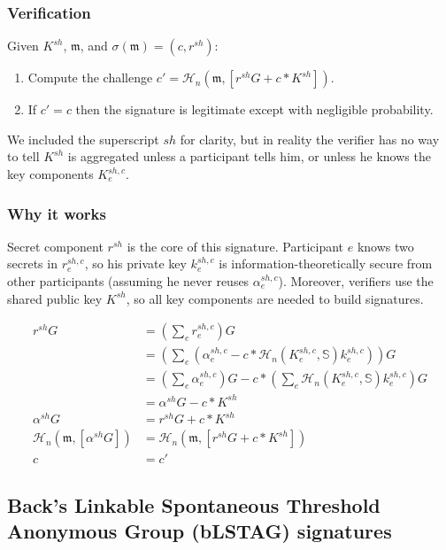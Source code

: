 \subsubsection*{Verification}

Given $K^{sh}$, $\mathfrak{m}$, and $\sigma(\mathfrak{m}) = (c,r^{sh})$:

\begin{enumerate}
    \item Compute the challenge $c' = \mathcal{H}_n(\mathfrak{m},[r^{sh} G + c*K^{sh}])$.
    \item If $c' = c$ then the signature is legitimate except with negligible probability.
\end{enumerate}

We included the superscript $sh$ for clarity, but in reality the verifier has no way to tell $K^{sh}$ is aggregated unless a participant tells him, or unless he knows the key components $K^{sh,c}_e$.

\subsubsection*{Why it works}

Secret component $r^{sh}$ is the core of this signature. Participant $e$ knows two secrets in $r^{sh,c}_e$, so his private key $k^{sh,c}_e$ is information-theoretically secure from other participants (assuming he never reuses $\alpha^{sh,c}_e$). Moreover, verifiers use the shared public key $K^{sh}$, so all key components are needed to build signatures.

\begin{align*}
    r^{sh} G &= (\sum_e r^{sh,c}_e) G \\
      &= (\sum_e (\alpha^{sh,c}_e - c*\mathcal{H}_n(K^{sh,c}_e,\mathbb{S}) k^{sh,c}_e)) G \\
      &= (\sum_e \alpha^{sh,c}_e) G - c*(\sum_e \mathcal{H}_n(K^{sh,c}_e,\mathbb{S}) k^{sh,c}_e) G \\
      &= \alpha^{sh} G - c*K^{sh} \\
    \alpha^{sh} G &= r^{sh} G + c*K^{sh} \\
    \mathcal{H}_n(\mathfrak{m},[\alpha^{sh} G]) &= \mathcal{H}_n(\mathfrak{m},[r^{sh} G + c*K^{sh}]) \\
    c &= c'
\end{align*}


\subsection{Back's Linkable Spontaneous Threshold Anonymous Group (bLSTAG) signatures}
\label{sec:bLSTAG}

